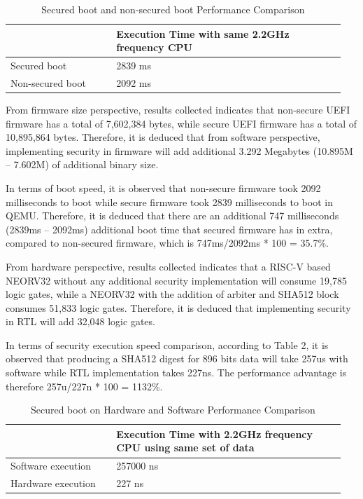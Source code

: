 \documentclass[review]{elsarticle}
\begin{document}
\begin{table}[hbt!]
\caption{Secured boot and non-secured boot Performance Comparison}
    \begin{tabular}{|p{0.3\linewidth} | p{0.65\linewidth} |}
        \hline
         & Execution Time with same 2.2GHz frequency CPU\\
        \hline 
        Secured boot & 2839 ms  \\
        \hline
        Non-secured boot & 2092 ms \\
        \hline
    \end{tabular}
\end{table}


From firmware size perspective, results collected indicates that non-secure UEFI firmware has a total of 7,602,384 bytes, while secure UEFI firmware has a total of 10,895,864 bytes. Therefore, it is deduced that from software perspective, implementing security in firmware will add additional 3.292 Megabytes (10.895M – 7.602M) of additional binary size.

In terms of boot speed, it is observed that non-secure firmware took 2092 milliseconds to boot while secure firmware took 2839 milliseconds to boot in QEMU. Therefore, it is deduced that there are an additional 747 milliseconds (2839ms – 2092ms) additional boot time that secured firmware has in extra, compared to non-secured firmware, which is 747ms/2092ms * 100 = 35.7\%.

From hardware perspective, results collected indicates that a RISC-V based NEORV32 without any additional security implementation will consume 19,785 logic gates, while a NEORV32 with the addition of arbiter and SHA512 block consumes 51,833 logic gates. Therefore, it is deduced that implementing security in RTL will add 32,048 logic gates.

In terms of security execution speed comparison, according to Table 2, it is observed that producing a SHA512 digest for 896 bits data will take 257us with software while RTL implementation takes 227ns. The performance advantage is therefore 257u/227n * 100 = 1132\%.

\begin{table}[hbt!]
\caption{Secured boot on Hardware and Software Performance Comparison}
    \begin{tabular}{|p{0.3\linewidth} | p{0.65\linewidth} |}
        \hline
         & Execution Time with 2.2GHz frequency CPU using same set of data \\
        \hline 
        Software execution & 257000 ns  \\
        \hline
        Hardware execution & 227 ns \\
        \hline
    \end{tabular}
\end{table}
\end{document}
